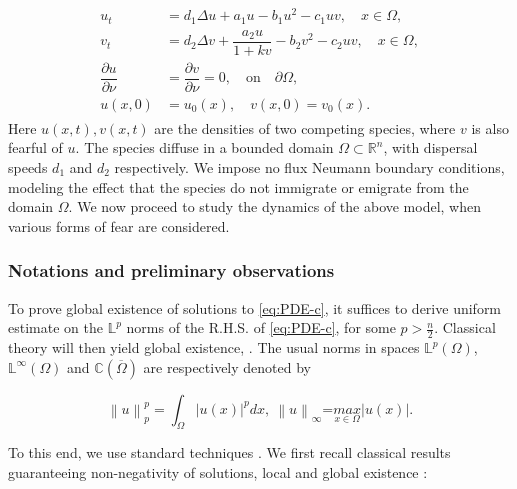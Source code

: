 \documentclass[10pt]{amsart}
\theoremstyle{definition}
\begin{document}
\begin{align}\label{eq:PDE-c}
	\begin{split}
		u_t &= d_1 \Delta u + a_1 u -b_1 u^2 -c_1 uv, \quad x\in \Omega, \\
		v_t &=  d_2 \Delta v +\dfrac{a_2 u}{1+ k v}  -b_2 v^2 -c_2 uv,\quad x\in \Omega,  \\
		\dfrac{\partial u}{\partial \nu} & = \dfrac{\partial v}{\partial \nu} =0, \quad \text{on} \quad \partial \Omega,\\
		u(x,0)&=u_0 (x), \quad v(x,0)=v_0(x).
	\end{split}
\end{align}
 Here $u(x,t), v(x,t)$ are the densities of two competing species, where $v$ is also fearful of $u$. The species diffuse in a bounded domain $\Omega \subset \mathbb{R}^{n}$, with dispersal speeds $d_{1}$ and  $d_{2}$ respectively. We impose no flux Neumann boundary conditions, modeling the effect that the species do not immigrate or emigrate from the domain $\Omega$. 
 We now proceed to study the dynamics of the above model, when various forms of fear are considered.

\subsubsection{Notations and preliminary observations}
\label{notat}

To prove global existence of solutions to \eqref{eq:PDE-c}, it suffices to derive uniform estimate on the $\mathbb{L}^{p}$ norms of the R.H.S. of \eqref{eq:PDE-c}, for some $p > \frac{n}{2}$. 
Classical theory will then yield global existence, \cite{henry}.
The usual norms in spaces $\mathbb{L}^{p}(\Omega )$, $\mathbb{L}^{\infty
}(\Omega ) $ and $\mathbb{C}\left( \overline{\Omega }\right) $ are
respectively denoted by

\begin{equation}
\label{(2.2)}
\left\| u\right\| _{p}^{p} = 
\int_{\Omega }\left| u(x)\right|^{p}dx, \ \left\| u\right\| _{\infty }\text{=}\underset{x\in \Omega }{max}\left|
u(x)\right| .  
\end{equation}

 To this end, we use standard techniques \cite{ Morgan89}. We first recall classical results guaranteeing non-negativity of solutions, local and global existence \cite{P10, Morgan89}:
\end{document}
